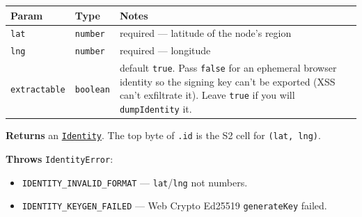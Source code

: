 \documentclass[
  nobib]{tufte-handout}
\newcounter{none} %
\providecommand{\tightlist}{%
  \setlength{\itemsep}{0pt}\setlength{\parskip}{0pt}}
\begin{document}
{\def\LTcaptype{none} %
\begin{longtable}[]{@{}
  >{\raggedright\arraybackslash}p{}
  >{\raggedright\arraybackslash}p{}
  >{\raggedright\arraybackslash}p{}@{}}
\toprule\noalign{}
\begin{minipage}[b]{\linewidth}\raggedright
Param
\end{minipage} & \begin{minipage}[b]{\linewidth}\raggedright
Type
\end{minipage} & \begin{minipage}[b]{\linewidth}\raggedright
Notes
\end{minipage} \\
\midrule\noalign{}
\endhead
\bottomrule\noalign{}
\endlastfoot
\texttt{lat} & \texttt{number} & required --- latitude of the node's
region \\
\texttt{lng} & \texttt{number} & required --- longitude \\
\texttt{extractable} & \texttt{boolean} & default \texttt{true}. Pass
\texttt{false} for an ephemeral browser identity so the signing key
can't be exported (XSS can't exfiltrate it). Leave \texttt{true} if you
will \texttt{dumpIdentity} it. \\
\end{longtable}
}

\textbf{Returns} an \hyperref[identity-type]{\texttt{Identity}}. The top
byte of \texttt{.id} is the S2 cell for \texttt{(lat,\ lng)}.

\textbf{Throws} \texttt{IdentityError}:

\begin{itemize}
\tightlist
\item
  \texttt{IDENTITY\_INVALID\_FORMAT} --- \texttt{lat}/\texttt{lng} not
  numbers.
\item
  \texttt{IDENTITY\_KEYGEN\_FAILED} --- Web Crypto Ed25519
  \texttt{generateKey} failed.
\end{itemize}
\end{document}
